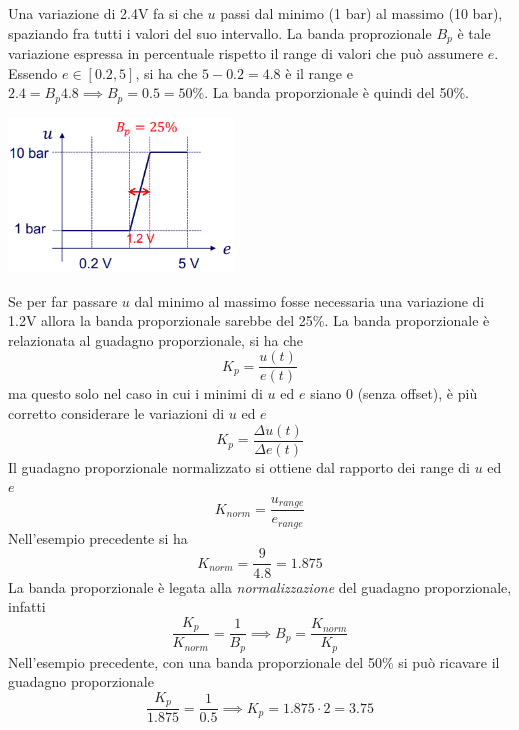 \documentclass[10pt, letterpaper]{report}
\begin{document}
Una variazione di 2.4V fa si che $u$ passi dal minimo (1 bar) al massimo (10 bar), spaziando fra tutti i valori del suo intervallo. La banda proprozionale $B_p$ è tale variazione espressa in percentuale rispetto il range di valori che può assumere $e$. Essendo $e\in [0.2,5]$, si ha che $5-0.2 = 4.8$ è il range e $2.4=B_p4.8\implies B_p=0.5=50\%$. La banda proporzionale è quindi del 50\%. 
\begin{center}
    \includegraphics[width=0.45\textwidth]{images/bandaproporzionale2.png} 
\end{center}
Se per far passare $u$ dal minimo al massimo fosse necessaria una variazione di 1.2V allora la banda proporzionale sarebbe del 25\%.
\acc 
La banda proporzionale è relazionata al guadagno proporzionale, si ha che 
$$ K_p=\frac{u(t)}{e(t)}$$ 
ma questo solo nel caso in cui i minimi di $u$ ed $e$ siano 0 (senza offset), è più corretto considerare le variazioni di $u$ ed $e$
$$ K_p=\frac{\Delta u(t)}{\Delta e(t)}$$ 
Il guadagno proporzionale normalizzato si ottiene dal rapporto dei range di $u$ ed $e$
$$ K_{norm}=\frac{u_{range}}{e_{range}}$$
Nell'esempio precedente si ha 
$$ K_{norm}=\frac{9}{4.8}=1.875$$
La banda proporzionale è legata alla \textit{normalizzazione} del guadagno proporzionale, infatti 
$$ \frac{K_p}{K_{norm}}=\frac{1}{B_p}\implies B_p=\frac{K_{norm}}{K_p}$$
Nell'esempio precedente, con una banda proporzionale del 50\% si può ricavare il guadagno proporzionale 
$$ \frac{K_p}{1.875}=\frac{1}{0.5}\implies K_p=1.875\cdot 2 = 3.75$$
\end{document}
